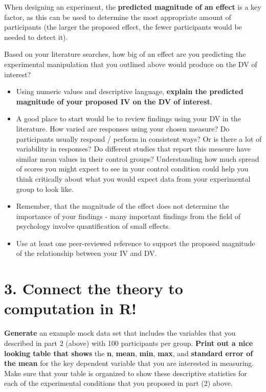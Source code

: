 \documentclass[
]{book}
\begin{document}
When designing an experiment, the \textbf{predicted magnitude of an effect} is a key factor, as this can be used to determine the most appropriate amount of participants (the larger the proposed effect, the fewer participants would be needed to detect it).

Based on your literature searches, how big of an effect are you predicting the experimental manipulation that you outlined above would produce on the DV of interest?

\begin{itemize}
\item
  Using numeric values and descriptive language, \textbf{explain the predicted magnitude of your proposed IV on the DV of interest}.
\item
  A good place to start would be to review findings using your DV in the literature. How varied are responses using your chosen measure? Do participants usually respond / perform in consistent ways? Or is there a lot of variability in responses? Do different studies that report this measure have similar mean values in their control groups? Understanding how much spread of scores you might expect to see in your control condition could help you think critically about what you would expect data from your experimental group to look like.
\item
  Remember, that the magnitude of the effect does not determine the importance of your findings - many important findings from the field of psychology involve quantification of small effects.
\item
  Use at least one peer-reviewed reference to support the proposed magnitude of the relationship between your IV and DV.
\end{itemize}

\section*{3. Connect the theory to computation in R!}\label{connect-the-theory-to-computation-in-r}

\textbf{Generate} an example mock data set that includes the variables that you described in part 2 (above) with 100 participants per group. \textbf{Print out a nice looking table that shows} the \textbf{n}, \textbf{mean}, \textbf{min}, \textbf{max}, and \textbf{standard error of the mean} for the key dependent variable that you are interested in measuring. Make sure that your table is organized to show these descriptive statistics for each of the experimental conditions that you proposed in part (2) above.
\end{document}
